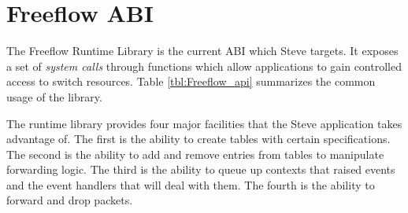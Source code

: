 

\section{Freeflow ABI} \label{fp:dp_interface}

The Freeflow Runtime Library is the current ABI which Steve targets. It exposes a set of \emph{system calls} through functions which allow applications to gain controlled access to switch resources. Table \ref{tbl:Freeflow_api} summarizes the common usage of the library.

The runtime library provides four major facilities that the Steve application takes advantage of. The first is the ability to create tables with certain specifications. The second is the ability to add and remove entries from tables to manipulate forwarding logic. The third is the ability to queue up contexts that raised events and the event handlers that will deal with them. The fourth is the ability to forward and drop packets.

